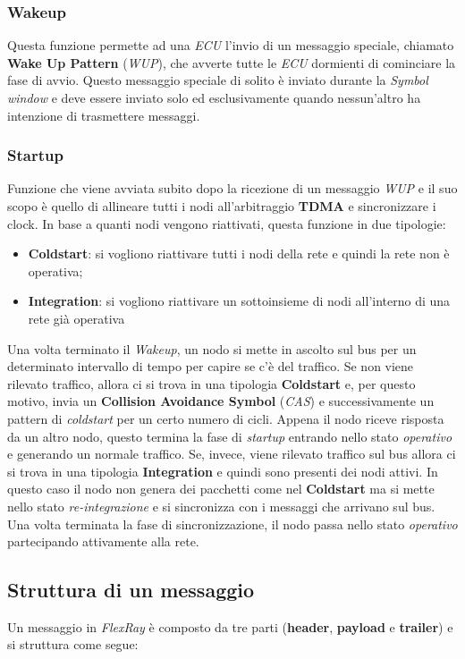 \subsubsection{Wakeup}
Questa funzione permette ad una \emph{ECU} l'invio di un messaggio speciale, chiamato \textbf{Wake Up Pattern} (\emph{WUP}), che avverte tutte le \emph{ECU} dormienti di cominciare la fase di avvio. Questo messaggio speciale di solito è inviato durante la \emph{Symbol window} e deve essere inviato solo ed esclusivamente quando nessun'altro ha intenzione di trasmettere messaggi. \cite{eos_flexray}

\subsubsection{Startup}
Funzione che viene avviata subito dopo la ricezione di un messaggio \emph{WUP} e il suo scopo è quello di allineare tutti i nodi all'arbitraggio \textbf{TDMA} e sincronizzare i clock. In base a quanti nodi vengono riattivati, questa funzione in due tipologie:
\begin{itemize}
    \item \textbf{Coldstart}: si vogliono riattivare tutti i nodi della rete e quindi la rete non è operativa;
    \item \textbf{Integration}: si vogliono riattivare un sottoinsieme di nodi all'interno di una rete già operativa
\end{itemize}

Una volta terminato il \emph{Wakeup}, un nodo si mette in ascolto sul bus per un determinato intervallo di tempo per capire se c'è del traffico. Se non viene rilevato traffico, allora ci si trova in una tipologia \textbf{Coldstart} e, per questo motivo, invia un \textbf{Collision Avoidance Symbol} (\emph{CAS}) e successivamente un pattern di \emph{coldstart} per un certo numero di cicli. Appena il nodo riceve risposta da un altro nodo, questo termina la fase di \emph{startup} entrando nello stato \emph{operativo} e generando un normale traffico. Se, invece, viene rilevato traffico sul bus allora ci si trova in una tipologia \textbf{Integration} e quindi sono presenti dei nodi attivi. In questo caso il nodo non genera dei pacchetti come nel \textbf{Coldstart} ma si mette nello stato \emph{re-integrazione} e si sincronizza con i messaggi che arrivano sul bus. Una volta terminata la fase di sincronizzazione, il nodo passa nello stato \emph{operativo} partecipando attivamente alla rete.

\subsection{Struttura di un messaggio}
Un messaggio in \emph{FlexRay} è composto da tre parti (\textbf{header}, \textbf{payload} e \textbf{trailer}) e si struttura come segue:

